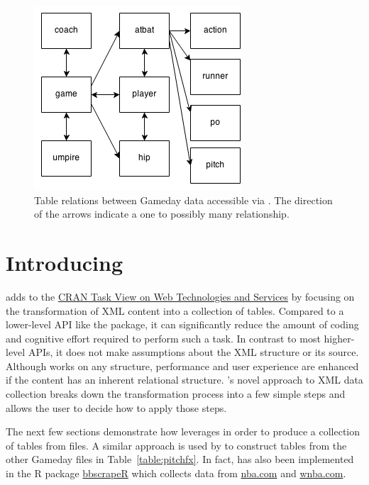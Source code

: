 \begin{article}
\begin{figure}
\centerline{\includegraphics[scale = 0.75]{Drawing1.png}}

\caption{Table relations between Gameday data accessible via .
The direction of the arrows indicate a one to possibly many relationship.
\label{fig:relations}}


\end{figure}



\section[Introducing XML2R]{Introducing }

 adds to the \href{http://cran.r-project.org/web/views/WebTechnologies.html}{CRAN Task View on Web Technologies and Services}
by focusing on the transformation of XML content into a collection
of tables. Compared to a lower-level API like the  package,
it can significantly reduce the amount of coding and cognitive effort
required to perform such a task. In contrast to most higher-level
APIs, it does not make assumptions about the XML structure or its
source. Although  works on any structure, performance
and user experience are enhanced if the content has an inherent relational
structure. 's novel approach to XML data collection breaks
down the transformation process into a few simple steps and allows
the user to decide how to apply those steps.

The next few sections demonstrate how  leverages 
in order to produce a collection of tables from 
files. A similar approach is used by  to construct
tables from the other Gameday files in Table~\ref{table:pitchfx}.
In fact,  has also been implemented in the R package \href{https://github.com/cpsievert/bbscrapeR}{bbscrapeR}
which collects data from \href{http://nba.com}{nba.com} and \href{http://wnba.com}{wnba.com}.



\end{article}
